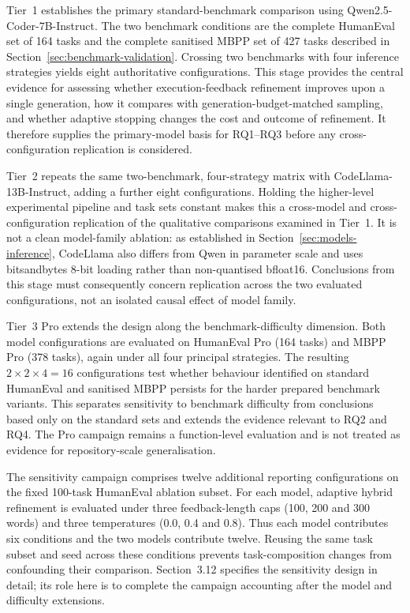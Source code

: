 Tier~1 establishes the primary standard-benchmark comparison using Qwen2.5-Coder-7B-Instruct. The two benchmark conditions are the complete HumanEval set of 164 tasks and the complete sanitised MBPP set of 427 tasks described in Section~\ref{sec:benchmark-validation}. Crossing two benchmarks with four inference strategies yields eight authoritative configurations. This stage provides the central evidence for assessing whether execution-feedback refinement improves upon a single generation, how it compares with generation-budget-matched sampling, and whether adaptive stopping changes the cost and outcome of refinement. It therefore supplies the primary-model basis for RQ1--RQ3 before any cross-configuration replication is considered.

Tier~2 repeats the same two-benchmark, four-strategy matrix with CodeLlama-13B-Instruct, adding a further eight configurations. Holding the higher-level experimental pipeline and task sets constant makes this a cross-model and cross-configuration replication of the qualitative comparisons examined in Tier~1. It is not a clean model-family ablation: as established in Section~\ref{sec:models-inference}, CodeLlama also differs from Qwen in parameter scale and uses bitsandbytes 8-bit loading rather than non-quantised bfloat16. Conclusions from this stage must consequently concern replication across the two evaluated configurations, not an isolated causal effect of model family.

Tier~3 Pro extends the design along the benchmark-difficulty dimension. Both model configurations are evaluated on HumanEval Pro (164 tasks) and MBPP Pro (378 tasks), again under all four principal strategies. The resulting $2 \times 2 \times 4=16$ configurations test whether behaviour identified on standard HumanEval and sanitised MBPP persists for the harder prepared benchmark variants. This separates sensitivity to benchmark difficulty from conclusions based only on the standard sets and extends the evidence relevant to RQ2 and RQ4. The Pro campaign remains a function-level evaluation and is not treated as evidence for repository-scale generalisation.

The sensitivity campaign comprises twelve additional reporting configurations on the fixed 100-task HumanEval ablation subset. For each model, adaptive hybrid refinement is evaluated under three feedback-length caps (100, 200 and 300 words) and three temperatures (0.0, 0.4 and 0.8). Thus each model contributes six conditions and the two models contribute twelve. Reusing the same task subset and seed across these conditions prevents task-composition changes from confounding their comparison. Section~3.12 specifies the sensitivity design in detail; its role here is to complete the campaign accounting after the model and difficulty extensions.

